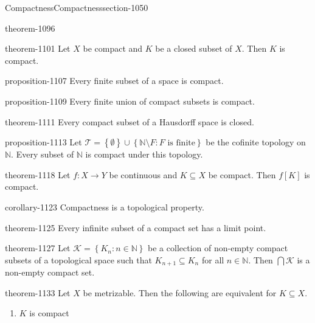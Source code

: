 \documentclass[oneside,10pt,]{article}
\newcommand{\mb}{\mathbb}
\newcommand{\mc}{\mathcal}
\newcommand{\setBuilder}[2]{\left\{#1:#2\right\}}
\newcommand{\setList}[1]{\left\{#1\right\}}
\begin{document}
\begin{sectionptx}{Compactness}{}{Compactness}{}{}{section-1050}
\begin{theorem}{}{}{theorem-1096}
\end{theorem}
\begin{theorem}{}{}{theorem-1101}%
\hypertarget{p-1102}{}%
Let \(X\) be compact and \(K\) be a closed subset of \(X\). Then \(K\) is compact.%
\end{theorem}
\begin{proposition}{}{}{proposition-1107}%
\hypertarget{p-1108}{}%
Every finite subset of a space is compact.%
\end{proposition}
\begin{proposition}{}{}{proposition-1109}%
\hypertarget{p-1110}{}%
Every finite union of compact subsets is compact.%
\end{proposition}
\begin{theorem}{}{}{theorem-1111}%
\hypertarget{p-1112}{}%
Every compact subset of a Hausdorff space is closed.%
\end{theorem}
\begin{proposition}{}{}{proposition-1113}%
\hypertarget{p-1114}{}%
Let \(\mc T=\setList{\emptyset}\cup
\setBuilder{\mb N\setminus F}{F\text{ is finite}}\) be the cofinite topology on \(\mb N\). Every subset of \(\mb N\) is compact under this topology.%
\end{proposition}
\begin{theorem}{}{}{theorem-1118}%
\hypertarget{p-1119}{}%
Let \(f:X\to Y\) be continuous and \(K\subseteq X\) be compact. Then \(f[K]\) is compact.%
\end{theorem}
\begin{corollary}{}{}{corollary-1123}%
\hypertarget{p-1124}{}%
Compactness is a topological property.%
\end{corollary}
\begin{theorem}{}{}{theorem-1125}%
\hypertarget{p-1126}{}%
Every infinite subset of a compact set has a limit point.%
\end{theorem}
\begin{theorem}{}{}{theorem-1127}%
\hypertarget{p-1128}{}%
Let \(\mc K=\setBuilder{K_n}{n\in\mb N}\) be a collection of non-empty compact subsets of a topological space such that \(K_{n+1}\subseteq K_n\) for all \(n\in\mb N\). Then \(\bigcap\mc K\) is a non-empty compact set.%
\end{theorem}
\begin{theorem}{}{}{theorem-1133}%
\hypertarget{p-1134}{}%
Let \(X\) be metrizable. Then the following are equivalent for \(K\subseteq X\).%
\leavevmode%
\begin{enumerate}
\item\hypertarget{li-1138}{}\(K\) is compact%

\end{enumerate}
\end{theorem}
\end{sectionptx}
\end{document}
